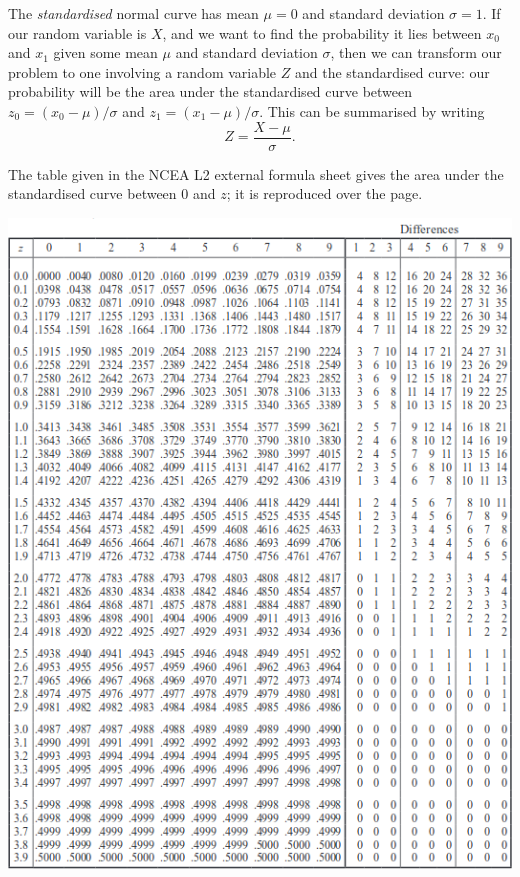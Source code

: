 The \emph{standardised} normal curve has mean $ \mu = 0 $ and standard deviation $ \sigma = 1 $.
If our random variable is $ X $, and we want to find the probability it lies between $ x_0 $ and $ x_1 $
given some mean $ \mu $ and standard deviation $ \sigma $, then we can transform our problem
to one involving a random variable $ Z $ and the standardised curve: our probability will
be the area under the standardised curve between $ z_0 = (x_0 - \mu)/\sigma $ and $ z_1 = (x_1 - \mu)/\sigma $.
This can be summarised by writing
\begin{displaymath}
  Z = \frac{X - \mu}{\sigma}.
\end{displaymath}

The table given in the NCEA L2 external formula sheet gives the area under the standardised curve between 0 and $ z $;
it is reproduced over the page.

\clearpage
\begin{center}
  \includegraphics[height=0.8\textheight]{distributiontable}
\end{center}
\clearpage

